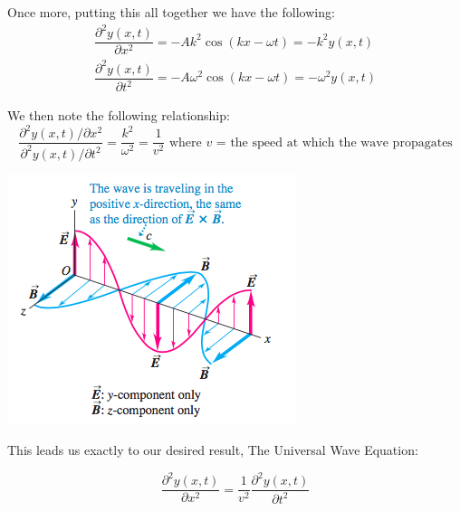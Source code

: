\documentclass[11pt]{article}
\begin{document}
Once more, putting this all together we have the following:
	\begin{eqnarray}
	\dfrac{\partial^2 y(x,t)}{\partial x^2} = -Ak^2 \cos(kx - \omega t) =
	-k^2 y(x,t) \\
	\dfrac{\partial^2 y(x,t)}{\partial t^2} = -A\omega^2 \cos(kx - \omega t) =
	-\omega^2 y(x,t)
	\end{eqnarray}
	
We then note the following relationship:
	\begin{equation}
	\dfrac{\partial^2 y(x,t) / \partial x^2}{\partial^2 y(x,t) / \partial t^2} =
	\dfrac{k^2}{\omega^2}	= \dfrac{1}{v^2} 
	\textrm{ where $v$ = the speed at which the wave propagates}
	\end{equation}

\pagebreak

\begin{center}
\includegraphics[scale=0.7]{emwaves}
\end{center}
This leads us exactly to our desired result, The Universal Wave Equation:

	\begin{equation}
	\dfrac{\partial^2 y(x,t)}{\partial x^2} 
	=  \dfrac{1}{v^2} \dfrac{\partial^2 y(x,t)}{\partial t^2} 
	\end{equation}
\end{document}
